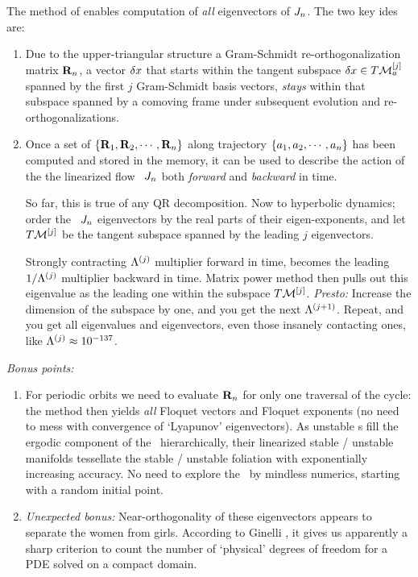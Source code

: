 The method of  enables computation of
{\em all} eigenvectors of $J_n$. The two key ides are:
\begin{enumerate}
  \item
Due to the upper-triangular structure a Gram-Schmidt
re-orthogonalization matrix ${\bf R}_n$, a vector ${\delta x}$
that starts within the tangent subspace ${\delta x} \in
T{\cal M}_{a}^{[j]}$ spanned by the first $j$ Gram-Schmidt basis
vectors, {\em stays} within that subspace spanned by a comoving
frame under subsequent evolution and re-orthogonalizations.
\item Once a set of $\{{\bf R}_1,{\bf R}_2,\cdots,{\bf R}_n\}$
along trajectory $\{a_1,a_2,\cdots,a_n\}$ has been
computed and stored in the memory, it can be used to describe
the action of the the linearized flow \jacobianM\ $J_n$
both \emph{forward} and \emph{backward} in time.

So far, this is true of any QR decomposition. Now to
hyperbolic dynamics; order the \jacobianM\ $J_n$
eigenvectors \jEigvec[\ell] by the real parts of their
eigen-exponents, and let $T{\cal M}^{[j]}$ be the tangent
subspace spanned by the leading $j$ eigenvectors.

Strongly contracting $\Lambda^{(j)}$ multiplier forward in
time, becomes the leading $1/\Lambda^{(j)}$ multiplier
backward in time. Matrix power method then pulls out this
eigenvalue as the leading one within the subspace
$T{\cal M}^{[j]}$. \emph{Presto:} Increase the dimension of the
subspace by one, and you get the next $\Lambda^{(j+1)}$.
Repeat, and you get all eigenvalues and eigenvectors, even
those insanely contacting ones, like $\Lambda^{(j)}
\approx 10^{-137}$.

\end{enumerate}
\emph{Bonus points:}
\begin{enumerate}
  \item For periodic orbits we need to evaluate ${\bf R}_n$ for
  only one traversal of the cycle: the method then yields {\em
  all} Floquet vectors and Floquet exponents (no need to mess
  with convergence of `Lyapunov' eigenvectors). As unstable \po
  s fill the ergodic component of the \statesp\ hierarchically,
  their linearized stable / unstable manifolds tessellate the
  stable / unstable foliation with exponentially increasing
  accuracy. No need to explore the \statesp\ by mindless
  numerics, starting with a random initial point.

  \item \emph{Unexpected bonus:} Near-orthogonality of
      these eigenvectors appears to separate the women from
      girls. According to Ginelli
      \etal{}, it gives us apparently a
      sharp criterion to count the number of `physical'
      degrees of freedom for a PDE solved on a compact
      domain.
\end{enumerate}

